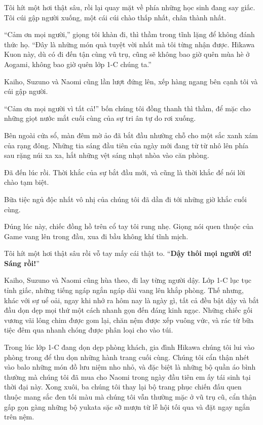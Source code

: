 \documentclass[../main.tex]{subfiles}
\begin{document}
Tôi hít một hơi thật sâu, rồi lại quay mặt về phía những học sinh đang say giấc. Tôi cúi gập người xuống, một cái cúi chào thấp nhất, chân thành nhất.

``Cảm ơn mọi người,'' giọng tôi khàn đi, thì thầm trong tĩnh lặng để không đánh thức họ. ``Đây là những món quà tuyệt vời nhất mà tôi từng nhận được. Hikawa Kuon này, dù có đi đến tận cùng vũ trụ, cũng sẽ không bao giờ quên mùa hè ở Aogami, không bao giờ quên lớp 1-C chúng ta.''

Kaiho, Suzuno và Naomi cũng lần lượt đứng lên, xếp hàng ngang bên cạnh tôi và cúi gập người.

``Cảm ơn mọi người vì tất cả!'' bốn chúng tôi đồng thanh thì thầm, để mặc cho những giọt nước mắt cuối cùng của sự tri ân tự do rơi xuống.

Bên ngoài cửa sổ, màn đêm mờ ảo đã bắt đầu nhường chỗ cho một sắc xanh xám của rạng đông. Những tia sáng đầu tiên của ngày mới đang từ từ nhô lên phía sau rặng núi xa xa, hắt những vệt sáng nhạt nhòa vào căn phòng.

Đã đến lúc rồi. Thời khắc của sự bắt đầu mới, và cũng là thời khắc để nói lời chào tạm biệt.

Bữa tiệc ngủ độc nhất vô nhị của chúng tôi đã dần đi tới những giờ khắc cuối cùng.

Đúng lúc này, chiếc đồng hồ trên cổ tay tôi rung nhẹ. Giọng nói quen thuộc của Game vang lên trong đầu, xua đi bầu không khí tĩnh mịch.


Tôi hít một hơi thật sâu rồi vỗ tay mấy cái thật to. ``\textbf{Dậy thôi mọi người ơi! Sáng rồi!}''

Kaiho, Suzuno và Naomi cũng hùa theo, đi lay từng người dậy. Lớp 1-C lục tục tỉnh giấc, những tiếng ngáp ngắn ngáp dài vang lên khắp phòng. Thế nhưng, khác với sự uể oải, ngay khi nhớ ra hôm nay là ngày gì, tất cả đều bật dậy và bắt đầu dọn dẹp mọi thứ một cách nhanh gọn đến đáng kinh ngạc. Những chiếc gối vương vãi lông chim được gom lại, chăn nệm được xếp vuông vức, và rác từ bữa tiệc đêm qua nhanh chóng được phân loại cho vào túi.

Trong lúc lớp 1-C đang dọn dẹp phòng khách, gia đình Hikawa chúng tôi lui vào phòng trong để thu dọn những hành trang cuối cùng. Chúng tôi cẩn thận nhét vào balo những món đồ lưu niệm nho nhỏ, và đặc biệt là những bộ quần áo bình thường mà chúng tôi đã mua cho Naomi trong ngày đầu tiên em ấy tái sinh tại thời đại này. Xong xuôi, ba chúng tôi thay lại bộ trang phục chiến đấu quen thuộc mang sắc đen tối màu mà chúng tôi vẫn thường mặc ở vũ trụ cũ, cẩn thận gấp gọn gàng những bộ yukata sặc sỡ mượn từ lễ hội tối qua và đặt ngay ngắn trên nệm.
\end{document}
